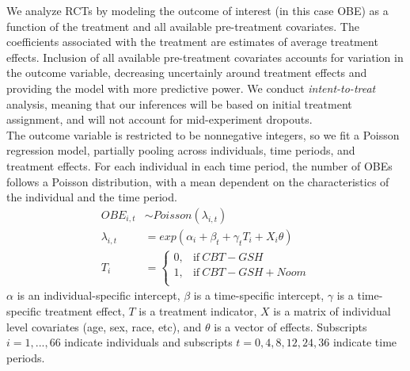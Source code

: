 \documentclass{article}
\begin{document}
We analyze RCTs by modeling the outcome of interest (in this case OBE) as a function of the treatment and all available pre-treatment covariates.  The coefficients associated with the treatment are estimates of average treatment effects.  Inclusion of all available pre-treatment covariates accounts for variation in the outcome variable, decreasing uncertainly around treatment effects and providing the model with more predictive power.  We conduct \emph{intent-to-treat} analysis, meaning that our inferences will be based on initial treatment assignment, and will not account for mid-experiment dropouts. \\
The outcome variable is restricted to be nonnegative integers, so we fit a Poisson regression model, partially pooling across individuals, time periods, and treatment effects. For each individual in each time period, the number of OBEs follows a Poisson distribution, with a mean dependent on the characteristics of the individual and the time period.  
\begin{align}
OBE_{i,t} &\sim Poisson(\lambda_{i,t}) \\
\lambda_{i,t} &= exp(\alpha_i + \beta_t + \gamma_tT_i + X_i\theta) \\
T_i &=
    \begin{cases}
      0, & \text{if}\ CBT-GSH \\
      1, & \text{if}\ CBT-GSH + Noom \\
    \end{cases}
\end{align}
$\alpha$ is an individual-specific intercept, $\beta$ is a time-specific intercept, $\gamma$ is a time-specific treatment effect, $T$ is a treatment indicator, $X$ is a matrix of individual level covariates (age, sex, race, etc), and $\theta$ is a vector of effects. Subscripts $i = 1, ..., 66$ indicate individuals and subscripts $t = 0, 4, 8, 12, 24, 36$ indicate time periods.
\end{document}
